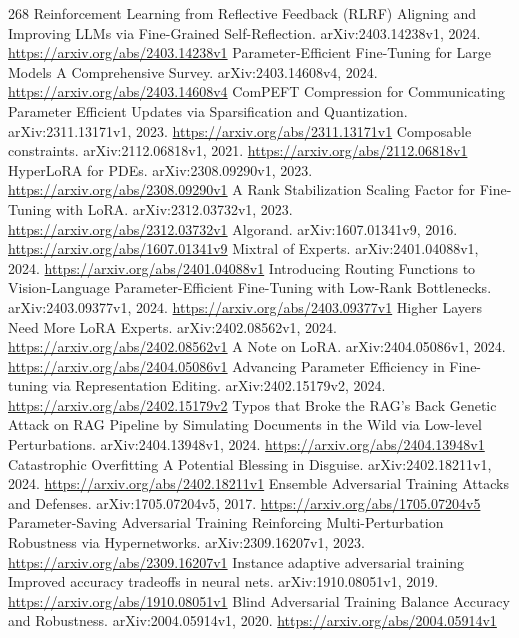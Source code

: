 \documentclass[11pt]{article}
\begin{document}
\begin{thebibliography}{268}
 Reinforcement Learning from Reflective Feedback (RLRF) Aligning and Improving LLMs via Fine-Grained Self-Reflection. arXiv:2403.14238v1, 2024. \url{https://arxiv.org/abs/2403.14238v1}
 Parameter-Efficient Fine-Tuning for Large Models A Comprehensive Survey. arXiv:2403.14608v4, 2024. \url{https://arxiv.org/abs/2403.14608v4}
 ComPEFT Compression for Communicating Parameter Efficient Updates via Sparsification and Quantization. arXiv:2311.13171v1, 2023. \url{https://arxiv.org/abs/2311.13171v1}
 Composable constraints. arXiv:2112.06818v1, 2021. \url{https://arxiv.org/abs/2112.06818v1}
 HyperLoRA for PDEs. arXiv:2308.09290v1, 2023. \url{https://arxiv.org/abs/2308.09290v1}
 A Rank Stabilization Scaling Factor for Fine-Tuning with LoRA. arXiv:2312.03732v1, 2023. \url{https://arxiv.org/abs/2312.03732v1}
 Algorand. arXiv:1607.01341v9, 2016. \url{https://arxiv.org/abs/1607.01341v9}
 Mixtral of Experts. arXiv:2401.04088v1, 2024. \url{https://arxiv.org/abs/2401.04088v1}
 Introducing Routing Functions to Vision-Language Parameter-Efficient Fine-Tuning with Low-Rank Bottlenecks. arXiv:2403.09377v1, 2024. \url{https://arxiv.org/abs/2403.09377v1}
 Higher Layers Need More LoRA Experts. arXiv:2402.08562v1, 2024. \url{https://arxiv.org/abs/2402.08562v1}
 A Note on LoRA. arXiv:2404.05086v1, 2024. \url{https://arxiv.org/abs/2404.05086v1}
 Advancing Parameter Efficiency in Fine-tuning via Representation Editing. arXiv:2402.15179v2, 2024. \url{https://arxiv.org/abs/2402.15179v2}
 Typos that Broke the RAG's Back Genetic Attack on RAG Pipeline by Simulating Documents in the Wild via Low-level Perturbations. arXiv:2404.13948v1, 2024. \url{https://arxiv.org/abs/2404.13948v1}
 Catastrophic Overfitting A Potential Blessing in Disguise. arXiv:2402.18211v1, 2024. \url{https://arxiv.org/abs/2402.18211v1}
 Ensemble Adversarial Training Attacks and Defenses. arXiv:1705.07204v5, 2017. \url{https://arxiv.org/abs/1705.07204v5}
 Parameter-Saving Adversarial Training Reinforcing Multi-Perturbation Robustness via Hypernetworks. arXiv:2309.16207v1, 2023. \url{https://arxiv.org/abs/2309.16207v1}
 Instance adaptive adversarial training Improved accuracy tradeoffs in neural nets. arXiv:1910.08051v1, 2019. \url{https://arxiv.org/abs/1910.08051v1}
 Blind Adversarial Training Balance Accuracy and Robustness. arXiv:2004.05914v1, 2020. \url{https://arxiv.org/abs/2004.05914v1}

\end{thebibliography}
\end{document}
